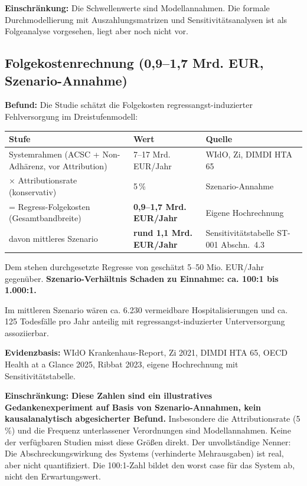 \documentclass{umbruch-position}
\begin{document}
\textbf{Einschr\"ankung:} Die Schwellenwerte sind Modellannahmen. Die formale Durchmodellierung mit Auszahlungsmatrizen und Sensitivit\"atsanalysen ist als Folgeanalyse vorgesehen, liegt aber noch nicht vor.

\subsection{Folgekostenrechnung (0,9--1,7 Mrd. EUR, Szenario-Annahme)}

\textbf{Befund:} Die Studie sch\"atzt die Folgekosten regressangst-induzierter Fehlversorgung im Dreistufenmodell:

\smallskip
{\small
\begin{tabularx}{\textwidth}{lXl}
\hline
\textbf{Stufe} & \textbf{Wert} & \textbf{Quelle} \\
\hline
Systemrahmen (ACSC + Non-Adh\"arenz, vor Attribution) & 7--17 Mrd. EUR/Jahr & WIdO, Zi, DIMDI HTA 65 \\
$\times$ Attributionsrate (konservativ) & 5\,\% & Szenario-Annahme \\
= Regress-Folgekosten (Gesamtbandbreite) & \textbf{0,9--1,7 Mrd. EUR/Jahr} & Eigene Hochrechnung \\
davon mittleres Szenario & \textbf{rund 1,1 Mrd. EUR/Jahr} & Sensitivit\"atstabelle ST-001 Abschn.~4.3 \\
\hline
\end{tabularx}
}
\smallskip

Dem stehen durchgesetzte Regresse von gesch\"atzt 5--50 Mio. EUR/Jahr gegen\"uber. \textbf{Szenario-Verh\"altnis Schaden zu Einnahme: ca. 100:1 bis 1.000:1.}

Im mittleren Szenario w\"aren ca. 6.230 vermeidbare Hospitalisierungen und ca. 125 Todesf\"alle pro Jahr anteilig mit regressangst-induzierter Unterversorgung assoziierbar.

\textbf{Evidenzbasis:} WIdO Krankenhaus-Report, Zi 2021, DIMDI HTA 65, OECD Health at a Glance 2025, Ribbat 2023, eigene Hochrechnung mit Sensitivit\"atstabelle.

\textbf{Einschr\"ankung:} \textbf{Diese Zahlen sind ein illustratives Gedankenexperiment auf Basis von Szenario-Annahmen, kein kausalanalytisch abgesicherter Befund.} Insbesondere die Attributionsrate (5\,\%) und die Frequenz unterlassener Verordnungen sind Modellannahmen. Keine der verf\"ugbaren Studien misst diese Gr\"o\ss{}en direkt. Der unvollst\"andige Nenner: Die Abschreckungswirkung des Systems (verhinderte Mehrausgaben) ist real, aber nicht quantifiziert. Die 100:1-Zahl bildet den worst case f\"ur das System ab, nicht den Erwartungswert.
\end{document}
